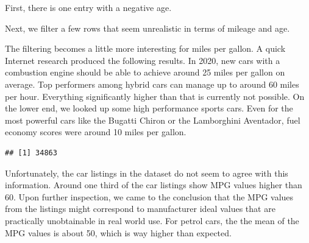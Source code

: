 \documentclass[sigchi]{acmart}
\newenvironment{Shaded}{\begin{snugshade}}{\end{snugshade}}
\newcommand{\DecValTok}[1]{\textcolor[rgb]{0.00,0.00,0.81}{#1}}
\newcommand{\KeywordTok}[1]{\textcolor[rgb]{0.13,0.29,0.53}{\textbf{#1}}}
\newcommand{\NormalTok}[1]{#1}
\newcommand{\OperatorTok}[1]{\textcolor[rgb]{0.81,0.36,0.00}{\textbf{#1}}}
\newcommand{\StringTok}[1]{\textcolor[rgb]{0.31,0.60,0.02}{#1}}
\begin{document}
First, there is one entry with a negative age.

\begin{Shaded}
\end{Shaded}

Next, we filter a few rows that seem unrealistic in terms of mileage and age.

\begin{Shaded}
\end{Shaded}

The filtering becomes a little more interesting for miles per gallon. A quick Internet research produced the following results. In 2020, new cars with a combustion engine should be able to achieve around 25 miles per gallon on average. Top performers among hybrid cars can manage up to around 60 miles per hour. Everything significantly higher than that is currently not possible. On the lower end, we looked up some high performance sports cars. Even for the most powerful cars like the Bugatti Chiron or the Lamborghini Aventador, fuel economy scores were around 10 miles per gallon.

\begin{Shaded}
\end{Shaded}

\begin{verbatim}
## [1] 34863
\end{verbatim}

Unfortunately, the car listings in the dataset do not seem to agree with this information. Around one third of the car listings show MPG values higher than 60. Upon further inspection, we came to the conclusion that the MPG values from the listings might correspond to manufacturer ideal values that are practically unobtainable in real world use. For petrol cars, the the mean of the MPG values is about 50, which is way higher than expected.
\end{document}
